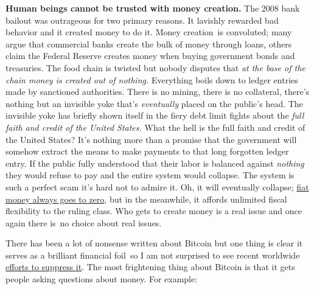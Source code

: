 \begin{enumerate}
  \textbf{Human beings cannot be trusted with money
  creation.} The 2008 bank bailout was outrageous for two
  primary reasons. It lavishly rewarded bad behavior and it created
  money to do it. Money creation~is convoluted; many argue that
  commercial banks create the bulk of money through loans, others claim
  the Federal Reserve creates money when buying government bonds and
  treasuries. The food chain is twisted but nobody disputes that
  \emph{at the base of the chain money is created out of nothing.}
  Everything boils down to ledger entries made by sanctioned
  authorities. There is no mining, there is no collateral, there's
  nothing but an invisible yoke that's \emph{eventually} placed on the
  public's head. The invisible yoke has briefly shown itself in the
  fiery debt limit fights about the \emph{full faith and credit of the
  United States.} What the hell is the full faith and credit of the
  United States? It's nothing more than a promise that the government
  will somehow extract the means to make payments to that long forgotten
  ledger entry. If the public fully understood that their labor is
  balanced against \emph{nothing} they would refuse to pay and the
  entire system would collapse. The system is such a perfect scam it's
  hard not to admire it. Oh, it will eventually collapse;
  \href{http://dailyreckoning.com/fiat-currency/}{fiat money always goes
  to zero}, but in the meanwhile, it affords unlimited fiscal
  flexibility to the ruling class. Who gets to create money is a real
  issue and once again there is~no choice about real issues.
\end{enumerate}

There has been a lot of nonsense written about Bitcoin but one thing is
clear it serves as a brilliant financial foil~so I am not surprised to
see recent worldwide
\href{http://www.coindesk.com/btce-pulls-support-ruble-russia-bans-bitcoin/}{efforts
to suppress it}. The most frightening thing about Bitcoin is that it
gets people asking questions about money. For example:

